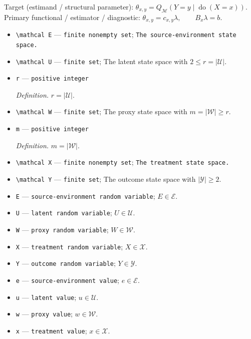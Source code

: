 \documentclass{article}
\begin{document}
Target (estimand / structural parameter): \(\theta_{x,y}=Q_{\mathcal M}(Y=y\mid\operatorname{do}(X=x))\).
Primary functional / estimator / diagnostic: \(\theta_{x,y}=c_{x,y}\lambda,\qquad B_x\lambda=b\).
\begin{itemize}
  \item \texttt{\textbackslash{}\allowbreak{}mathcal E} --- \texttt{finite nonempty set}; \texttt{The source-\allowbreak{}environment state space.}
  \item \texttt{\textbackslash{}\allowbreak{}mathcal U} --- \texttt{finite set}; The latent state space with \(2\le r=\lvert\mathcal U\rvert\).
  \item \texttt{r} --- \texttt{positive integer}
  \par\smallskip\noindent\emph{Definition.} \(r=\lvert\mathcal U\rvert\).
  \item \texttt{\textbackslash{}\allowbreak{}mathcal W} --- \texttt{finite set}; The proxy state space with \(m=\lvert\mathcal W\rvert\ge r\).
  \item \texttt{m} --- \texttt{positive integer}
  \par\smallskip\noindent\emph{Definition.} \(m=\lvert\mathcal W\rvert\).
  \item \texttt{\textbackslash{}\allowbreak{}mathcal X} --- \texttt{finite nonempty set}; \texttt{The treatment state space.}
  \item \texttt{\textbackslash{}\allowbreak{}mathcal Y} --- \texttt{finite set}; The outcome state space with \(\lvert\mathcal Y\rvert\ge2\).
  \item \texttt{E} --- \texttt{source-\allowbreak{}environment random variable}; \(E\in\mathcal E\).
  \item \texttt{U} --- \texttt{latent random variable}; \(U\in\mathcal U\).
  \item \texttt{W} --- \texttt{proxy random variable}; \(W\in\mathcal W\).
  \item \texttt{X} --- \texttt{treatment random variable}; \(X\in\mathcal X\).
  \item \texttt{Y} --- \texttt{outcome random variable}; \(Y\in\mathcal Y\).
  \item \texttt{e} --- \texttt{source-\allowbreak{}environment value}; \(e\in\mathcal E\).
  \item \texttt{u} --- \texttt{latent value}; \(u\in\mathcal U\).
  \item \texttt{w} --- \texttt{proxy value}; \(w\in\mathcal W\).
  \item \texttt{x} --- \texttt{treatment value}; \(x\in\mathcal X\).

\end{itemize}
\end{document}
